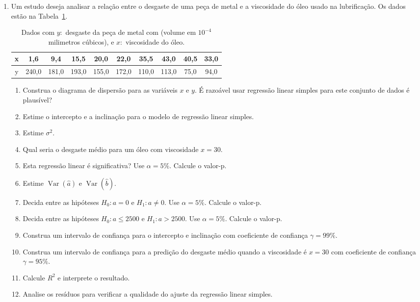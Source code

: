 \documentclass[12pt, a4paper]{article}
\DeclareMathOperator {\vari}{Var}
\begin{document}
\begin{enumerate}
	\item Um estudo deseja analisar a relação entre o desgaste de uma peça de metal e a viscosidade do óleo usado na lubrificação. Os dados estão na Tabela~\ref{tab:viscosidade-desgaste}.
	\begin{table}[htbp]
		\centering
		\begin{tabular}{c|ccccccccc}
			\toprule[0.05cm]
			x & 1,6 & 9,4 & 15,5 & 20,0 & 22,0 & 35,5 & 43,0 & 40,5 & 33,0 \\ \midrule[0.025cm]
			y & 240,0 & 181,0 & 193,0 & 155,0 & 172,0 & 110,0 & 113,0 & 75,0 & 94,0 \\ 
			\bottomrule[0.05cm]
		\end{tabular}
		\caption{Dados com $y:$ desgaste da peça de metal com (volume em $10^{-4}$ milimetros cúbicos), e $x:$ viscosidade do óleo.} 
		\label{tab:viscosidade-desgaste}
	\end{table}
	\begin{enumerate}
		\item Construa o diagrama de dispersão para as variáveis $x$ e $y$. É razoável usar regressão linear simples para este conjunto de dados é plausível?
		\item Estime o intercepto e a inclinação para o modelo de regressão linear simples.
		\item Estime $\sigma^2$.
		\item Qual seria o desgaste médio para um óleo com viscosidade $x= 30$.
		\item Esta regressão linear é significativa? Use $\alpha = 5\%$. Calcule o valor-p.
		\item Estime $\vari(\hat{a})$ e $\vari(\hat{b})$.
		\item Decida entre as hipóteses $H_0: a=0$ e $H_1: a \neq 0$. Use $\alpha = 5\%$. Calcule o valor-p.
		\item Decida entre as hipóteses $H_0: a \leq 2500$ e $H_1: a > 2500$. Use $\alpha = 5\%$. Calcule o valor-p.
		\item Construa um intervalo de confiança para o intercepto e inclinação com coeficiente de confiança $\gamma=99\%$.
		\item Construa um intervalo de confiança para a predição do desgaste médio quando a viscosidade é $x=30$ com coeficiente de confiança $\gamma = 95\%$.
		\item Calcule $R^2$ e interprete o resultado.
		\item Analise os resíduos para verificar a qualidade do ajuste da regressão linear simples.
	\end{enumerate}


\end{enumerate}
\end{document}
